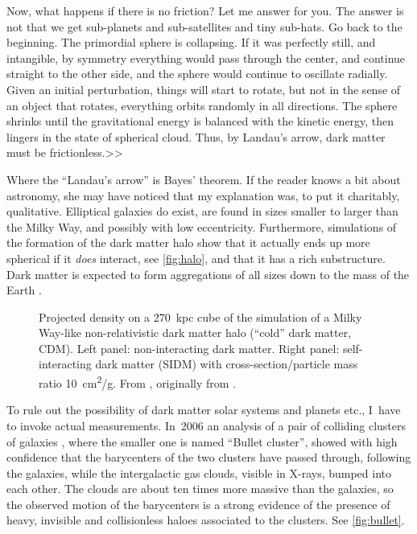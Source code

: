Now, what happens if there is no friction? Let me answer for you. The answer is
not that we get sub-planets and sub-satellites and tiny sub-hats. Go back to
the beginning. The primordial sphere is collapsing. If it was perfectly still,
and intangible, by symmetry everything would pass through the center, and
continue straight to the other side, and the sphere would continue to oscillate
radially. Given an initial perturbation, things will start to rotate, but not
in the sense of an object that rotates, everything orbits randomly in all
directions. The sphere shrinks until the gravitational energy is balanced with
the kinetic energy, then lingers in the state of spherical cloud. Thus, by
Landau's arrow, dark matter must be frictionless.>>

Where the ``Landau's arrow'' is Bayes' theorem. If the reader knows a bit about
astronomy, she may have noticed that my explanation was, to put it charitably,
qualitative. Elliptical galaxies do exist, are found in sizes smaller to larger
than the Milky Way, and possibly with low eccentricity. Furthermore,
simulations of the formation of the dark matter halo show that it actually ends
up more spherical if it \emph{does} interact, see \autoref{fig:halo}, and that
it has a rich substructure. Dark matter is expected to form aggregations of all
sizes down to the mass of the Earth \cite[1]{vogelsberger2012}.

\begin{figure}
    
    
    \caption{\label{fig:halo} Projected density on a \SI{270}{kpc} cube of the
    simulation of a Milky Way-like non-relativistic dark matter halo (``cold''
    dark matter, CDM). Left panel: non-interacting dark matter. Right panel:
    self-interacting dark matter (SIDM) with cross-section/particle mass ratio
    \SI{10}{cm^2/g}. From \cite[21]{tulin2017}, originally from
    \cite[6]{vogelsberger2012}.}
    
\end{figure}

To rule out the possibility of dark matter solar systems and planets etc.,
I~have to invoke actual measurements. In~2006 an analysis of a pair of
colliding clusters of galaxies \cite{clowe2006}, where the smaller one is named
``Bullet cluster'', showed with high confidence that the barycenters of the two
clusters have passed through, following the galaxies, while the intergalactic
gas clouds, visible in X-rays, bumped into each other. The clouds are about ten
times more massive than the galaxies, so the observed motion of the barycenters
is a strong evidence of the presence of heavy, invisible and collisionless
haloes associated to the clusters. See \autoref{fig:bullet}.

